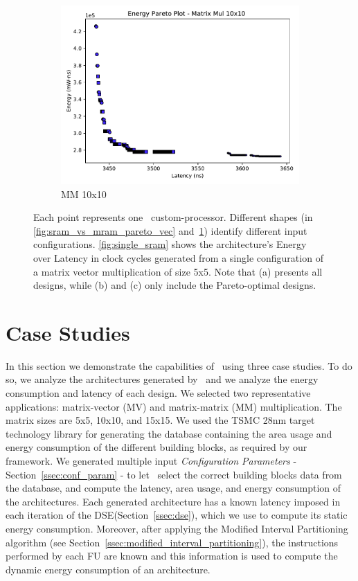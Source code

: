 \begin{figure}[ht]
\begin{subfigure}{.33\textwidth}
  \includegraphics[width=\textwidth]{graphs/EnergyParetoMatrixMul10.pdf}
  \caption{MM 10x10}
  \label{fig:sram_vs_mram_pareto_mul}
\end{subfigure}
    \caption{\small Each point represents one \frameworkname~custom-processor. Different shapes (in \ref{fig:sram_vs_mram_pareto_vec} and~\ref{fig:sram_vs_mram_pareto_mul}) identify different input configurations. \ref{fig:single_sram} shows the architecture's Energy over Latency in clock cycles generated from a single configuration of a matrix vector multiplication of size 5x5. Note that (a) presents all designs, while (b) and (c) only include the Pareto-optimal designs.}
\label{fig:case_studies_1}
\end{figure}
\section{Case Studies}
\label{sec:case_studies}
In this section we demonstrate the capabilities of \frameworkname~using three case studies. To do so, we analyze the architectures generated by \frameworkname~and we analyze the energy consumption and latency of each design.
We selected two representative applications: matrix-vector (MV) and matrix-matrix (MM) multiplication. The matrix sizes are 5x5, 10x10, and 15x15. We used the TSMC 28nm target technology library for generating the database containing the area usage and energy consumption of the different building blocks, as required by our framework.
We generated multiple input \textit{Configuration Parameters} - Section~\ref{ssec:conf_param} - to let \frameworkname~select the correct building blocks data from the database, and compute the latency, area usage, and energy consumption of the architectures. Each generated architecture has a known latency imposed in each iteration of the DSE(Section~\ref{ssec:dse}), which we use to compute its static energy consumption. Moreover, after applying the Modified Interval Partitioning algorithm (see Section~\ref{ssec:modified_interval_partitioning}), the instructions performed by each FU are known and this information is used to compute the dynamic energy consumption of an architecture. 

